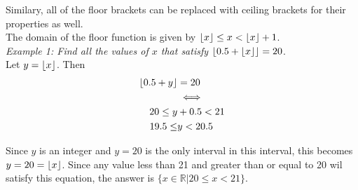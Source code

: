         \noindent Similary, all of the floor brackets can be replaced with ceiling brackets for
        their properties as well. \\

        \noindent The domain of the floor function is given by $\floor*{x}\leq x<\floor*{x}+1$. \\

        \noindent \color{blue} \textit{Example 1: Find all the values of $x$ that satisfy
        $\floor*{0.5+\floor*{x}}=20$}. \color{black} \\
        Let $y=\floor*{x}$. Then \\

        \begin{align*}
            \floor*{0.5+y} &= 20 \\
            & \iff \\
            20\leq y &+ 0.5 <21\\
            19.5\leq &y <20.5
        \end{align*}

        \noindent Since $y$ is an integer and $y=20$ is the only interval in this interval,
        this becomes $y=20=\floor*{x}$. Since any value less than 21 and greater than or equal to
        20 wil satisfy this equation, the answer is $\{x\in\mathbb{R}|20\leq x<21\}$. \\

